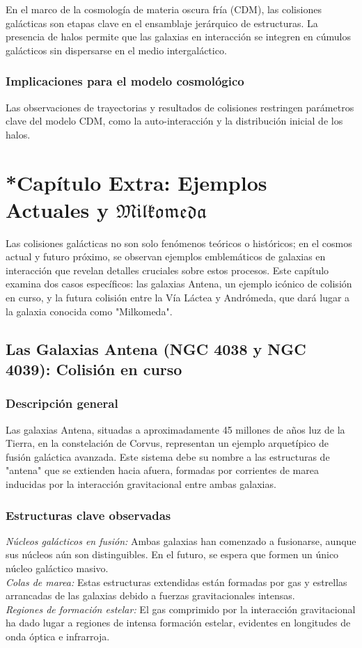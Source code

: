 \documentclass{article}
\begin{document}
En el marco de la cosmología de materia oscura fría (CDM), las colisiones galácticas son etapas clave en el ensamblaje jerárquico de estructuras.
La presencia de halos permite que las galaxias en interacción se integren en cúmulos galácticos sin dispersarse en el medio intergaláctico.
\subsubsection*{Implicaciones para el modelo cosmológico}

Las observaciones de trayectorias y resultados de colisiones restringen parámetros clave del modelo CDM, como la auto-interacción y la distribución inicial de los halos.

\section{*Capítulo Extra: Ejemplos Actuales y $\mathfrak{Milkomeda}$}
Las colisiones galácticas no son solo fenómenos teóricos o históricos; en el cosmos actual y futuro próximo, se observan ejemplos emblemáticos de galaxias en interacción que revelan detalles cruciales sobre estos procesos. Este capítulo examina dos casos específicos: las galaxias Antena, un ejemplo icónico de colisión en curso, y la futura colisión entre la Vía Láctea y Andrómeda, que dará lugar a la galaxia conocida como "Milkomeda". \\

\subsection{Las Galaxias Antena (NGC 4038 y NGC 4039): Colisión en curso}
\subsubsection*{Descripción general}

Las galaxias Antena, situadas a aproximadamente 45 millones de años luz de la Tierra, en la constelación de Corvus, representan un ejemplo arquetípico de fusión galáctica avanzada.
Este sistema debe su nombre a las estructuras de "antena" que se extienden hacia afuera, formadas por corrientes de marea inducidas por la interacción gravitacional entre ambas galaxias.
\subsubsection*{Estructuras clave observadas}

\textit{Núcleos galácticos en fusión:} Ambas galaxias han comenzado a fusionarse, aunque sus núcleos aún son distinguibles. En el futuro, se espera que formen un único núcleo galáctico masivo. \\
\textit{Colas de marea:} Estas estructuras extendidas están formadas por gas y estrellas arrancadas de las galaxias debido a fuerzas gravitacionales intensas. \\
\textit{Regiones de formación estelar:} El gas comprimido por la interacción gravitacional ha dado lugar a regiones de intensa formación estelar, evidentes en longitudes de onda óptica e infrarroja.
\end{document}
